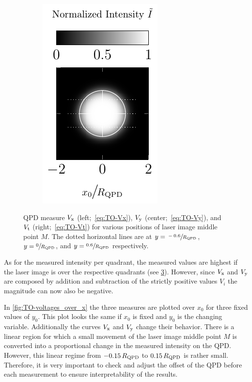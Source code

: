 \begin{figure}
\begin{subfigure}[b]{0.3\textwidth}
    \label{fig:TO-QPDy}
  \end{subfigure}
  \hfill
  \begin{subfigure}[b]{0.3\textwidth}
    \centering
    \includegraphics[]{Plots/cache/QPDt.pdf}
    \label{fig:TO-QPDt}
  \end{subfigure}
  \caption{QPD measure $V_{\mathrm{x}}$ (left;~\cref{eq:TO-Vx}), $V_{\mathrm{y}}$ 
    (center;~\cref{eq:TO-Vy}), and $V_{\mathrm{t}}$ (right;~\cref{eq:TO-Vt}) for 
    various positions of laser image middle point $M$. The dotted horizontal 
    lines are at $y=\sfrac{-0.6}{R_{\mathrm{QPD}}}$, $y=\sfrac{0}{R_{\mathrm{QPD}}}$, 
  and $y=\sfrac{0.6}{R_{\mathrm{QPD}}}$ respectively.}
  \label{fig:TO-QPDs}
 \end{figure}

As for the measured intensity per quadrant, the measured values are highest if 
the laser image is over the respective quadrants (see \cref{fig:TO-QPDs}). 
However, since $V_{\mathrm{x}}$ and $V_{\mathrm{y}}$ are composed by addition and 
subtraction of the strictly positive values $V_{i}$ the magnitude can now also 
be negative.

In \cref{fig:TO-voltages_over_x} the three measures are plotted over $x_{0}$ 
for three fixed values of $y_{0}$. This plot looks the same if $x_{0}$ is fixed 
and $y_{0}$ is the changing variable. Additionally the curves $V_{\mathrm{x}}$ and 
$V_{\mathrm{y}}$ change their behavior. There is a linear region for which a small 
movement of the laser image middle point $M$ is converted into a proportional 
change in the measured intensity on the QPD. However, this linear regime from 
$-0.15\,R_{\mathrm{QPD}}$ to $0.15\,R_{\mathrm{QPD}}$ is rather small. Therefore, it is 
very important to check and adjust the offset of the QPD before each 
measurement to ensure interpretability of the results.

